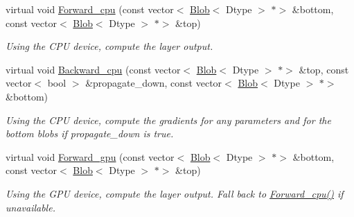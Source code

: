 \begin{DoxyCompactItemize}
\item 
\mbox{\label{classcaffe_1_1_reshape_layer_a0529c00e9d2fa47943ba5292cfdcb6db}} 
virtual void \mbox{\hyperlink{classcaffe_1_1_reshape_layer_a0529c00e9d2fa47943ba5292cfdcb6db}{Forward\+\_\+cpu}} (const vector$<$ \mbox{\hyperlink{classcaffe_1_1_blob}{Blob}}$<$ Dtype $>$ $\ast$$>$ \&bottom, const vector$<$ \mbox{\hyperlink{classcaffe_1_1_blob}{Blob}}$<$ Dtype $>$ $\ast$$>$ \&top)
\begin{DoxyCompactList}\small\item\em Using the C\+PU device, compute the layer output. \end{DoxyCompactList}\item 
\mbox{\label{classcaffe_1_1_reshape_layer_a8baafe3b84c6eee7709071a944355286}} 
virtual void \mbox{\hyperlink{classcaffe_1_1_reshape_layer_a8baafe3b84c6eee7709071a944355286}{Backward\+\_\+cpu}} (const vector$<$ \mbox{\hyperlink{classcaffe_1_1_blob}{Blob}}$<$ Dtype $>$ $\ast$$>$ \&top, const vector$<$ bool $>$ \&propagate\+\_\+down, const vector$<$ \mbox{\hyperlink{classcaffe_1_1_blob}{Blob}}$<$ Dtype $>$ $\ast$$>$ \&bottom)
\begin{DoxyCompactList}\small\item\em Using the C\+PU device, compute the gradients for any parameters and for the bottom blobs if propagate\+\_\+down is true. \end{DoxyCompactList}\item 
\mbox{\label{classcaffe_1_1_reshape_layer_a2b75e7b2d96b46b2fbdbab0ff238a1ad}} 
virtual void \mbox{\hyperlink{classcaffe_1_1_reshape_layer_a2b75e7b2d96b46b2fbdbab0ff238a1ad}{Forward\+\_\+gpu}} (const vector$<$ \mbox{\hyperlink{classcaffe_1_1_blob}{Blob}}$<$ Dtype $>$ $\ast$$>$ \&bottom, const vector$<$ \mbox{\hyperlink{classcaffe_1_1_blob}{Blob}}$<$ Dtype $>$ $\ast$$>$ \&top)
\begin{DoxyCompactList}\small\item\em Using the G\+PU device, compute the layer output. Fall back to \mbox{\hyperlink{classcaffe_1_1_reshape_layer_a0529c00e9d2fa47943ba5292cfdcb6db}{Forward\+\_\+cpu()}} if unavailable. \end{DoxyCompactList}\item 
\mbox{\label{classcaffe_1_1_reshape_layer_a7f433223bdd7d5e8aa9e73ee9dbea836}} 

\end{DoxyCompactItemize}
